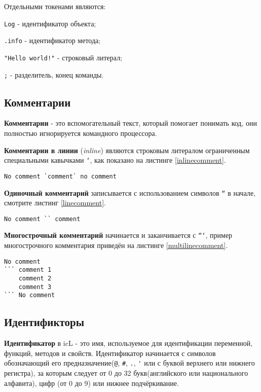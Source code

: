 Отдельными токенами являются:

\begin{icItems}
\item
	\lstinline|Log| - идентификатор объекта;
\item
	\lstinline|.info| - идентификатор метода;
\item
	\lstinline|"Hello world!"| - строковый литерал;
\item
	\lstinline|;| - разделитель, конец команды.
\end{icItems}

\subsection{Комментарии}

\textbf{Комментарии} - это вспомогательный текст, который помогает понимать код, они полностью игнорируется командного процессора.

\textbf{Комментарии в линии} (\textit{inline}) являются строковым литералом ограниченным специальными кавычками \texttt{`}, как показано на листинге \ref{inlinecomment}.

\begin{lstlisting}[caption=Комментарий в линии,label=inlinecomment]
No comment `comment` no comment
\end{lstlisting}

\textbf{Одиночный комментарий} записывается с использованием символов \texttt{``} в начале, смотрите листинг \ref{linecomment}.

\begin{lstlisting}[caption=Одиночный комментарий,label=linecomment]
No comment `` comment
\end{lstlisting}

\textbf{Многострочный комментарий} начинается и заканчивается с \texttt{```}, пример многострочного комментария приведён на листинге \ref{multilinecomment}.

\begin{lstlisting}[caption=Многострочный комментарий,label=multilinecomment]
No comment
``` comment 1
	comment 2
	comment 3
``` No comment
\end{lstlisting}

\subsection{Идентификторы}

\textbf{Идентификатор} в icL - это имя, используемое для идентификации переменной, функций, методов и свойств. Идентификатор начинается с символов обозначающий его предназначение(\lstinline|@|, \lstinline|#|, \lstinline|.|, \lstinline|'| или с буквой верхнего или нижнего регистра), за которым следует от 0 до 32 букв(английского или национального алфавита), цифр (от 0 до 9) или нижнее подчёркивание.

